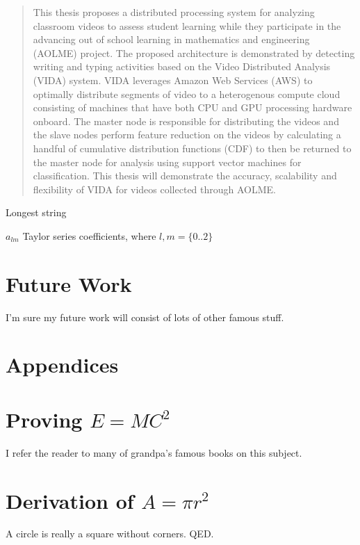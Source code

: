 \documentclass[botnum, fleqn]{unmeethesis}
\begin{document}
  \begin{abstract}
    This thesis proposes a distributed processing system for analyzing classroom
    videos to assess student learning while they participate in the advancing
    out of school learning in mathematics and engineering (AOLME) project. The
    proposed architecture is demonstrated by detecting writing and typing
    activities based on the Video Distributed Analysis (VIDA) system. VIDA
    leverages Amazon Web Services (AWS) to optimally distribute segments of
    video to a heterogenous compute cloud consisting of machines that have both
    CPU and GPU processing hardware onboard. The master node is responsible for
    distributing the videos and the slave nodes perform feature reduction on the
    videos by calculating a handful of cumulative distribution functions (CDF)
    to then be returned to the master node for analysis using support vector
    machines for classification. This thesis will  demonstrate the accuracy,
    scalability and flexibility of VIDA for videos collected through AOLME.

    \clearpage %
  \end{abstract}

  \tableofcontents
  \listoffigures
  \listoftables

  \begin{glossary}{Longest  string}
    \item[$a_{lm}$]
    Taylor series coefficients, where $l,m = \{0..2\}$
  \end{glossary}

  \mainmatter

  


  \chapter{Future Work}
  I'm sure my future work will consist of lots of other famous stuff.

  \chapter*{Appendices}


  \appendix
  \chapter{Proving $E=MC^2$}
  I refer the reader to many of grandpa's famous books on this subject.
  \chapter{Derivation of $A = \pi r^2$}
  A circle is really a square without corners.  QED.

\end{document}
